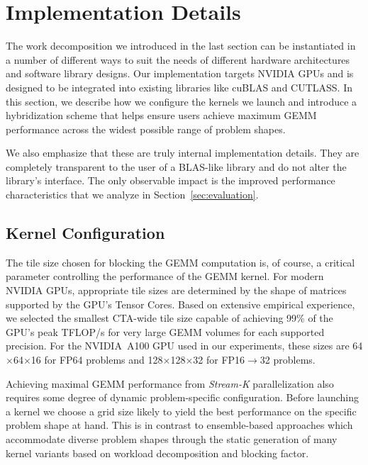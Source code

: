 \section{Implementation Details}
\label{sec:practical-usage}   

The work decomposition we introduced in the last section can be instantiated in a number of different ways to suit the needs of different hardware architectures and software library designs.  Our implementation targets NVIDIA GPUs and is designed to be integrated into existing libraries like cuBLAS and CUTLASS.  In this section, we describe how we configure the kernels we launch and introduce a hybridization scheme that helps ensure users achieve maximum GEMM performance across the widest possible range of problem shapes.

We also emphasize that these are truly internal implementation details. They are completely transparent to the user of a BLAS-like library and do not alter the library's interface.  The only observable impact is the improved performance characteristics that we analyze in
Section~\ref{sec:evaluation}.

\subsection{Kernel Configuration}
\label{sec:blocking-factor-and-grid-configuration}

The tile size chosen for blocking the GEMM computation is, of course, a critical parameter controlling the performance of the GEMM kernel.  For modern NVIDIA GPUs, appropriate tile sizes are determined by the shape of matrices supported by the GPU's Tensor Cores.  Based on extensive empirical experience, we selected the smallest CTA-wide tile size capable of achieving 99\% of the GPU's peak TFLOP/s for very large GEMM volumes for each supported precision.  For the NVIDIA~A100 GPU used in our experiments, these sizes are 64$\times$64$\times$16 for FP64 problems and 128$\times$128$\times$32 for FP16$\rightarrow$32 problems.

Achieving maximal GEMM performance from \emph{Stream-K} parallelization also requires some degree of dynamic problem-specific configuration. Before launching a kernel we choose a grid size likely to yield the best performance on the specific problem shape at hand.  This is in contrast to ensemble-based approaches which accommodate diverse problem shapes through the static generation of many kernel variants based on workload decomposition and blocking factor.

